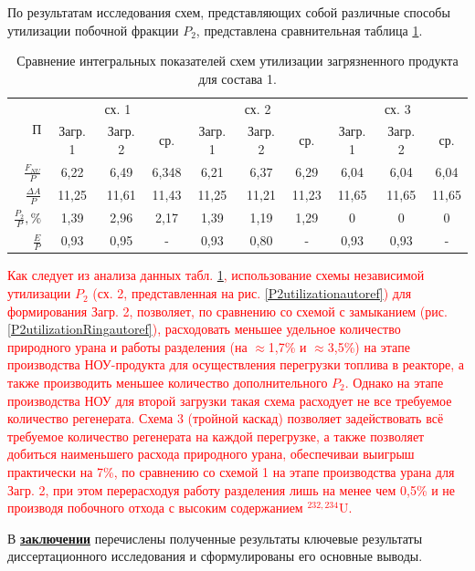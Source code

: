 По результатам исследования схем, представляющих собой различные способы утилизации побочной фракции $P_2$, представлена сравнительная таблица \ref{3loopautoref}.
\begin{table}
  \centering
  \caption{Сравнение интегральных показателей схем утилизации загрязненного продукта для состава 1.{\label{3loopautoref}}}
  \renewcommand{\arraystretch}{1.2}
  \begin{tabular}{|r|c|c|c|c|c|c|c|c|c|}
    \hline
    \multirow{2}{*}{П} & \multicolumn{3}{c|}{сх. 1} & \multicolumn{3}{c|}{сх. 2} & \multicolumn{3}{c|}{сх. 3}\\
    \cline{2-10}
    & {\tiny Загр.} 1 & {\tiny Загр.} 2 & ср. & {\tiny Загр.} 1 & {\tiny Загр.} 2 & ср. & {\tiny Загр.} 1 & {\tiny Загр.} 2 & ср. \\
    \hline
    $\frac{F_{NU}}{P}$ & 6,22 & 6,49 & 6,348 & 6,21 & 6,37 & 6,29 & 6,04 & 6,04 & 6,04\\ \hline
    $\frac{\Delta A}{P}$ & 11,25 & 11,61 & 11,43 & 11,25 & 11,21 & 11,23 & 11,65 & 11,65 & 11,65 \\ \hline
    $\frac{P_2}{P}, \%$  & 1,39 & 2,96 & 2,17 & 1,39 & 1,19 & 1,29 & 0 & 0 & 0 \\ \hline
    $\frac{E}{P}$    & 0,93 & 0,95 & - & 0,93 & 0,80 & - & 0,93 & 0,93 & - \\ \hline
  \end{tabular}
\end{table}

\textcolor{red}{Как следует из анализа данных табл. \ref{3loopautoref}, использование схемы независимой утилизации $P_2$ (сх. 2, представленная на рис. \ref{P2utilizationautoref}) для формирования Загр. 2, позволяет, по сравнению со схемой с замыканием (рис. \ref{P2utilizationRingautoref}), расходовать меньшее удельное количество природного урана и работы разделения (на $\approx$1,7\% и $\approx$3,5\%) на этапе производства НОУ-продукта для осуществления перегрузки топлива в реакторе, а также производить меньшее количество дополнительного $P_2$. Однако на этапе производства НОУ для второй загрузки такая схема расходует не все требуемое количество регенерата. Схема 3 (тройной каскад) позволяет задействовать всё требуемое количество регенерата на каждой перегрузке, а также позволяет добиться наименьшего расхода природного урана, обеспечиваи выигрыш практически на 7\%, по сравнению со схемой 1 на этапе производства урана для Загр. 2, при этом перерасходуя работу разделения лишь на менее чем 0,5\% и не производя побочного отхода с высоким содержанием $^{232,234}$U.}

\newpage

В \underline{\textbf{заключении}} перечислены полученные результаты ключевые результаты диссертационного исследования и сформулированы его основные выводы.



\insertbibliofull   
{}
